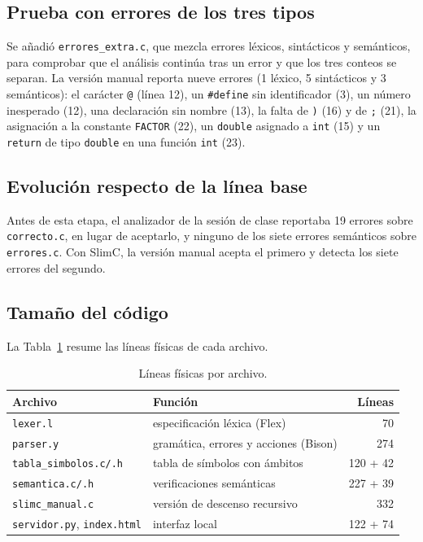 \documentclass[runningheads]{llncs}
\begin{document}
\subsection{Prueba con errores de los tres tipos}
Se añadió \texttt{errores\_extra.c}, que mezcla errores léxicos, sintácticos y semánticos, para comprobar que el análisis continúa tras un error y que los tres conteos se separan. La versión manual reporta nueve errores (1 léxico, 5 sintácticos y 3 semánticos): el carácter \texttt{@} (línea 12), un \texttt{\#define} sin identificador (3), un número inesperado (12), una declaración sin nombre (13), la falta de \texttt{)} (16) y de \texttt{;} (21), la asignación a la constante \texttt{FACTOR} (22), un \texttt{double} asignado a \texttt{int} (15) y un \texttt{return} de tipo \texttt{double} en una función \texttt{int} (23).

\subsection{Evolución respecto de la línea base}
Antes de esta etapa, el analizador de la sesión de clase reportaba 19 errores sobre \texttt{correcto.c}, en lugar de aceptarlo, y ninguno de los siete errores semánticos sobre \texttt{errores.c}. Con SlimC, la versión manual acepta el primero y detecta los siete errores del segundo.

\subsection{Tamaño del código}
La Tabla~\ref{tab:loc} resume las líneas físicas de cada archivo.

\begin{table}[t]
\caption{Líneas físicas por archivo.}\label{tab:loc}
\centering\footnotesize
\begin{tabular}{@{}llr@{}}
\toprule
Archivo & Función & Líneas\\
\midrule
\texttt{lexer.l} & especificación léxica (Flex) & 70\\
\texttt{parser.y} & gramática, errores y acciones (Bison) & 274\\
\texttt{tabla\_simbolos.c/.h} & tabla de símbolos con ámbitos & 120 + 42\\
\texttt{semantica.c/.h} & verificaciones semánticas & 227 + 39\\
\texttt{slimc\_manual.c} & versión de descenso recursivo & 332\\
\texttt{servidor.py}, \texttt{index.html} & interfaz local & 122 + 74\\
\bottomrule
\end{tabular}
\end{table}
\end{document}
